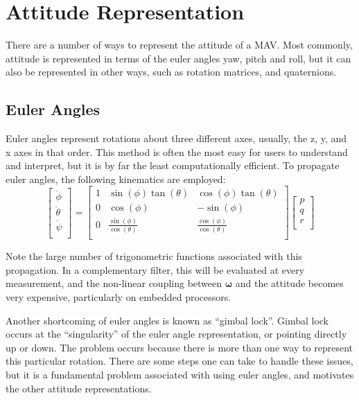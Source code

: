 \documentclass[paper=a4, fontsize=11pt]{scrartcl} %
\numberwithin{equation}{section} %
\numberwithin{figure}{section} %
\numberwithin{table}{section} %
\begin{document}
\section{Attitude Representation}
There are a number of ways to represent the attitude of a MAV.  Most commonly, attitude is represented in terms of the euler angles yaw, pitch and roll, but it can also be represented in other ways, such as rotation matrices, and quaternions.

\subsection{Euler Angles}
Euler angles represent rotations about three different axes, usually, the z, y, and x axes in that order.  This method is often the most easy for users to understand and interpret, but it is by far the least computationally efficient.  To propagate euler angles, the following kinematics are employed:
\begin{equation}
	\begin{bmatrix}
		\dot{\phi} \\
		\dot{\theta} \\
		\dot{\psi} \\
	\end{bmatrix}
	= 
	\begin{bmatrix}
		1 & \sin(\phi) \tan(\theta) & \cos(\phi)\tan(\theta) \\
		0 & \cos(\phi)              & -\sin(\phi) \\
		0 & \frac{\sin(\phi)}{\cos(\theta)} & \frac{\cos(\phi)}{\cos(\theta)}  \\
	\end{bmatrix}
	\begin{bmatrix}
		p \\
		q \\
		r \\
	\end{bmatrix}
\end{equation}

Note the large number of trigonometric functions associated with this propagation.  In a complementary filter, this will be evaluated at every measurement, and the non-linear coupling between $\bm{\omega}$  and the attitude becomes very expensive, particularly on embedded processors.

Another shortcoming of euler angles is known as ``gimbal lock''.  Gimbal lock occurs at the ``singularity'' of the euler angle representation, or pointing directly up or down.  The problem occurs because there is more than one way to represent this particular rotation.  There are some steps one can take to handle these issues, but it is a fundamental problem associated with using euler angles, and motivates the other attitude representations. 
\end{document}
